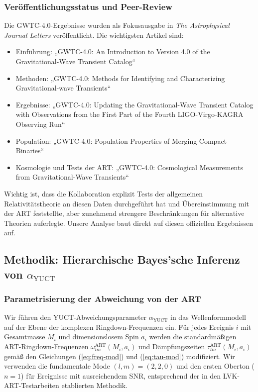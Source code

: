 \documentclass[12pt,a4paper]{article}
\theoremstyle{remark}
\begin{document}
	\subsubsection{Veröffentlichungsstatus und Peer-Review}
	
	Die GWTC-4.0-Ergebnisse wurden als Fokusausgabe in \textit{The Astrophysical Journal Letters} veröffentlicht. Die wichtigsten Artikel sind:
	
	\begin{itemize}
		\item Einführung: „GWTC-4.0: An Introduction to Version 4.0 of the Gravitational-Wave Transient Catalog“
		\item Methoden: „GWTC-4.0: Methods for Identifying and Characterizing Gravitational-wave Transients“
		\item Ergebnisse: „GWTC-4.0: Updating the Gravitational-Wave Transient Catalog with Observations from the First Part of the Fourth LIGO-Virgo-KAGRA Observing Run“
		\item Population: „GWTC-4.0: Population Properties of Merging Compact Binaries“
		\item Kosmologie und Tests der ART: „GWTC-4.0: Cosmological Measurements from Gravitational-Wave Transients“
	\end{itemize}
	
	Wichtig ist, dass die Kollaboration explizit Tests der allgemeinen Relativitätstheorie an diesen Daten durchgeführt hat und Übereinstimmung mit der ART feststellte, aber zunehmend strengere Beschränkungen für alternative Theorien auferlegte. Unsere Analyse baut direkt auf diesen offiziellen Ergebnissen auf.
	
	\subsection{Methodik: Hierarchische Bayes'sche Inferenz von $\alpha_{\text{YUCT}}$}
	
	\subsubsection{Parametrisierung der Abweichung von der ART}
	
	Wir führen den YUCT-Abweichungsparameter $\alpha_{\text{YUCT}}$ in das Wellenformmodell auf der Ebene der komplexen Ringdown-Frequenzen ein. Für jedes Ereignis $i$ mit Gesamtmasse $M_i$ und dimensionslosem Spin $a_i$ werden die standardmäßigen ART-Ringdown-Frequenzen $\omega_{lm}^{\text{ART}}(M_i, a_i)$ und Dämpfungszeiten $\tau_{lm}^{\text{ART}}(M_i, a_i)$ gemäß den Gleichungen (\ref{eq:freq-mod}) und (\ref{eq:tau-mod}) modifiziert. Wir verwenden die fundamentale Mode $(l,m) = (2,2,0)$ und den ersten Oberton ($n=1$) für Ereignisse mit ausreichendem SNR, entsprechend der in den LVK-ART-Testarbeiten etablierten Methodik.
	
\end{document}
